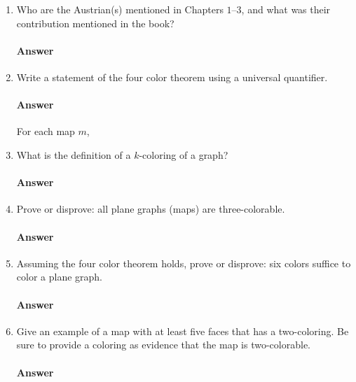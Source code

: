 \documentclass{article}
\begin{document}
\begin{enumerate}

    \item Who are the Austrian(s) mentioned in Chapters $1$--$3$, and what was their
        contribution mentioned in the book?

        \paragraph{Answer}

    \item Write a statement of the four color theorem using a universal
        quantifier.

        \paragraph{Answer}
        For each map $m$, 

    \item What is the definition of a $k$-coloring of a graph?

        \paragraph{Answer}

    \item Prove or disprove: all plane graphs (maps) are three-colorable.

        \paragraph{Answer}
        \todo{}

    \item Assuming the four color theorem holds, prove or disprove: six colors
        suffice to color a plane graph.

        \paragraph{Answer}
        \todo{}

    \item Give an example of a map with at least five faces that has a
        two-coloring.  Be sure to provide a coloring as evidence that the map is
        two-colorable.

        \paragraph{Answer}


\end{enumerate}
\end{document}
